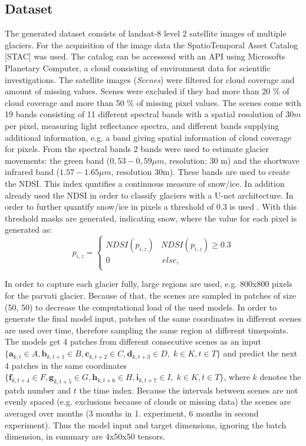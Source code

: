 \documentclass[12pt]{article}
\begin{document}
\subsection{Dataset}
The generated dataset consists of landsat-8 level 2 satellite images of multiple glaciers. For the acquisition of the image data the SpatioTemporal Asset Catalog [STAC] was used. The catalog can be accessesd with an API using Microsofts Planetary Computer, a cloud consisting of environment data for scientific investigations. The satellite images (\textit{Scenes}) were filtered for cloud coverage and amount of missing values. Scenes were excluded if they had more than 20 \% of cloud coverage and more than 50 \% of missing pixel values. The scenes come with 19 bands consisting of 11 different spectral bands with a spatial resolution of $30m$ per pixel, measuring light reflectance spectra, and different bands supplying additional information, e.g. a band giving spatial information of cloud coverage for pixels. From the spectral bands 2 bands were used to estimate glacier movements: the green band ($0,53-0,59 \mu m $, resolution: 30 m) and the shortwave infrared band ($1.57-1.65 \mu m$, resolution 30m). These bands are used to create the NDSI. This index quntifies a continuous measure of snow/ice. In addition \citet{he2020glacier} already used the NDSI in order to classify glaciers with a U-net architecture. In order to further quantify snow/ice in pixels a threshold of 0.3 is used \citep{vonica2021glacier}. With this threshold masks are generated, indicating snow, where the value for each pixel is generated as:
	$$
	 p_{i,z} = \left\{
	\begin{array}{ll}
		NDSI(p_{i,z}) & NDSI(p_{i,z}) \geq 0.3 \\
		0 & \, else,  \\
	\end{array}
	\right. $$
	
 In order to capture each glacier fully, large regions are used, e.g. 800x800 pixels for the parvati glacier. Because of that, the scenes are sampled in patches of size (50, 50) to decrease the computational load of the used models. In order to generate the final model input, patches of the same coordinates in different scenes are used over time, therefore sampling the same region at different timepoints. The models get 4 patches from different consecutive scenes as an input
 $\{\mathbf{a}_{k, t} \in A, \mathbf{b}_{k, t+1} \in B, \mathbf{c}_{k, t+2} \in C, \mathbf{d}_{k, t+3} \in D, \;  k \in K,  t \in T\}$ and predict the next 4 patches in the same coordinates $\{\mathbf{f}_{k, t+4} \in F, \mathbf{g}_{k, t+5} \in G, \mathbf{h}_{k, t+6} \in H, \mathbf{i}_{k, t+7} \in I,\;  k \in K,  t \in T \}$, where $k$ denotes the patch number and $t$ the time index.  Because the intervals between scenes are not evenly spaced (e.g. exclusions because of clouds or missing data) the scenes are averaged over months (3 months in 1. experiment, 6 months in second experiment). Thus the model input and target dimensions, ignoring the batch dimension, in summary are 4x50x50 tensors.
 
\end{document}
